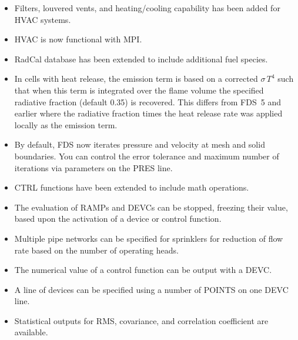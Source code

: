 \documentclass[11pt]{book}
\begin{document}

   \begin{itemize}
    \item Filters, louvered vents, and heating/cooling capability has been added for HVAC systems.
    \item HVAC is now functional with MPI.
    \end{itemize}


    \begin{itemize}
    \item RadCal database has been extended to include additional fuel species.
    \item In cells with heat release, the emission term is based on a corrected $\sigma \, T^4$ such that when this term is integrated over the flame volume the specified radiative fraction (default 0.35) is recovered. This differs from FDS~5 and earlier where the radiative fraction times the heat release rate was applied locally as the emission term.
    \end{itemize}


    \begin{itemize}
    \item By default, FDS now iterates pressure and velocity at mesh and solid boundaries. You can control the error tolerance and maximum number of iterations via parameters on the {\ct PRES} line.
    \end{itemize}


    \begin{itemize}
    \item {\ct CTRL} functions have been extended to include math operations.
    \item The evaluation of {\ct RAMP}s and {\ct DEVC}s can be stopped, freezing their value, based upon the activation of a device or control function.
    \end{itemize}


    \begin{itemize}
    \item Multiple pipe networks can be specified for sprinklers for reduction of flow rate based on the number of operating heads.
    \item The numerical value of a control function can be output with a {\ct DEVC}.
    \item A line of devices can be specified using a number of {\ct POINTS} on one {\ct DEVC} line.
    \item Statistical outputs for RMS, covariance, and correlation coefficient are available.
    \end{itemize}
\end{document}

